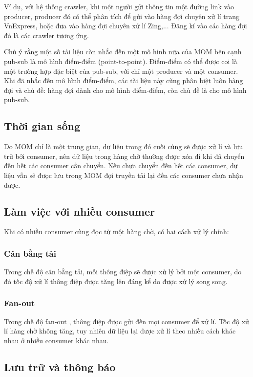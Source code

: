 \documentclass{article}
\begin{document}
Ví dụ, với hệ thống crawler, khi một người gửi thông tin một đường link vào
producer, producer đó có thể phân tích để gửi vào hàng đợi chuyên xử lí trang
VnExpress, hoặc đưa vào hàng đợi chuyên xử lí Zing,... Đăng kí vào các hàng đợi
đó là các crawler tương ứng.

Chú ý rằng một số tài liệu còn nhắc đến một mô hình nữa của MOM bên cạnh pub-sub
là mô hình điểm-điểm (point-to-point). Điểm-điểm có thể được coi là một trường
hợp đặc biệt của pub-sub, với chỉ một producer và một consumer. Khi đã nhắc đến
mô hình điểm-điểm, các tài liệu này cũng phân biệt luôn hàng đợi và chủ đề: hàng
đợi dành cho mô hình điểm-điểm, còn chủ đề là cho mô hình pub-sub.

\subsection{Thời gian sống}

Do MOM chỉ là một trung gian, dữ liệu trong đó cuối cùng sẽ được xử lí và lưu
trữ bởi consumer, nên dữ liệu trong hàng chờ thường được xóa đi khi đã chuyển
đến hết các consumer cần chuyển. Nếu chưa chuyển đến hết các consumer, dữ liệu
vẫn sẽ đưọc lưu trong MOM đợi truyền tải lại đến các consumer chưa nhận được.

\subsection{Làm việc với nhiều consumer}

Khi có nhiều consumer cùng đọc từ một hàng chờ, có hai cách xử lý chính:

\subsubsection{Cân bằng tải}

Trong chế độ cân bằng tải, mỗi thông điệp sẽ được xử lý bởi một consumer, do đó
tốc độ xử lí thông điệp được tăng lên đáng kể do được xử lý song song.

\subsubsection{Fan-out}

Trong chế độ fan-out \cite{waitingforcode2019}, thông điệp được gửi đến mọi
consumer để xử lí. Tốc độ xử lí hàng chờ không tăng, tuy nhiên dữ liệu lại được
xử lí theo nhiều cách khác nhau ở nhiều consumer khác nhau.

\subsection{Lưu trữ và thông báo}
\end{document}
